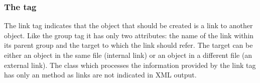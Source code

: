 \subsubsection{The  tag}

The link tag indicates that the object that should be created is a link to
another object. Like the group tag it has only two attributes: the name of the
link within its parent group and the target to which the link should refer. 
The target can be either an object in the same file (internal link) or an object
in a different file (an external link). The  class which processes 
the information provided by the link tag has only an  
method as links are not indicated in XML output. 





